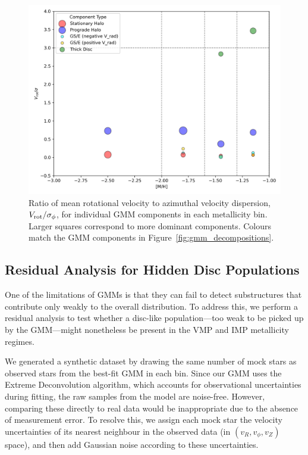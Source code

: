 \documentclass[a4paper,12pt]{article}
\begin{document}
\begin{figure}[h]
    \centering
    \includegraphics[width=\linewidth]{../figures/v_over_sigma_per_component.png}
    \caption{Ratio of mean rotational velocity to azimuthal velocity dispersion, $V_{\rm rot} / \sigma_\phi$, for individual GMM components in each metallicity bin. Larger squares correspond to more dominant components. Colours match the GMM components in Figure~\ref{fig:gmm_decompositions}.}
    \label{fig:v_over_sigma}
\end{figure}

\subsection{Residual Analysis for Hidden Disc Populations}

One of the limitations of GMMs is that they can fail to detect substructures that contribute 
only weakly to the overall distribution. To address this, we perform a residual analysis to test 
whether a disc-like population—too weak to be picked up by the GMM—might nonetheless be present 
in the VMP and IMP metallicity regimes.

We generated a synthetic dataset by drawing the same number of mock stars as observed stars from 
the best-fit GMM in each bin. Since our GMM uses the Extreme Deconvolution algorithm, which accounts 
for observational uncertainties during fitting, the raw samples from the model are noise-free. 
However, comparing these directly to real data would be inappropriate due to the absence of measurement 
error. To resolve this, we assign each mock star the velocity uncertainties of its nearest neighbour 
in the observed data (in $(v_R, v_\phi, v_Z)$ space), and then add Gaussian noise according to 
these uncertainties.
\end{document}
